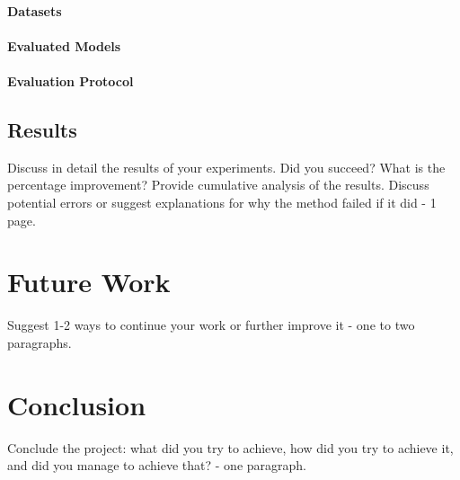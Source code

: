 \documentclass{acmart}
\begin{document}
\paragraph{Datasets}

\paragraph{Evaluated Models}

\paragraph{Evaluation Protocol}

\subsection{Results}
Discuss in detail the results of your experiments. Did you succeed? What is the percentage improvement? Provide cumulative analysis of the results. Discuss potential errors or suggest explanations for why the method failed if it did - 1 page.

\section{Future Work}
Suggest 1-2 ways to continue your work or further improve it - one to two paragraphs.

\section{Conclusion}
Conclude the project: what did you try to achieve, how did you try to achieve it, and did you manage to achieve that? - one paragraph.



\end{document}
